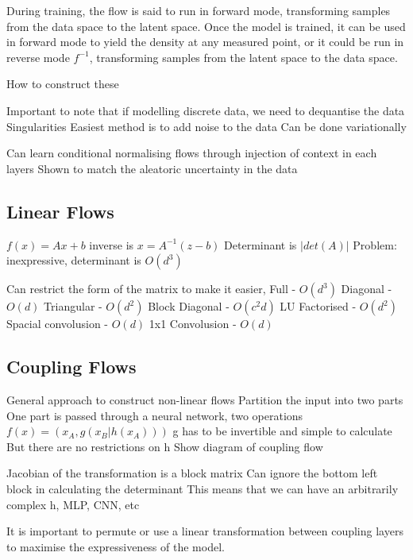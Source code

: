 During training, the flow is said to run in forward mode, transforming samples from the data space to the latent space.
Once the model is trained, it can be used in forward mode to yield the density at any measured point, or it could be run in reverse mode $f^{-1}$, transforming samples from the latent space to the data space.

How to construct these



Important to note that if modelling discrete data, we need to dequantise the data
Singularities
Easiest method is to add noise to the data
Can be done variationally

Can learn conditional normalising flows through injection of context in each layers
Shown to match the aleatoric uncertainty in the data

\subsection{Linear Flows}
$f(x) = Ax + b$
inverse is $x = A^{-1}(z - b)$
Determinant is $|det(A)|$
Problem: inexpressive, determinant is $O(d^3)$

Can restrict the form of the matrix to make it easier,
Full - $O(d^3)$
Diagonal - $O(d)$
Triangular - $O(d^2)$
Block Diagonal - $O(c^2d)$
LU Factorised - $O(d^2)$
Spacial convolusion - $O(d)$
1x1 Convolusion - $O(d)$

\subsection{Coupling Flows}

General approach to construct non-linear flows
Partition the input into two parts
One part is passed through a neural network, two operations
$f(x) = (x_A, g(x_B | h(x_A)))$
g has to be invertible and simple to calculate
But there are no restrictions on h
Show diagram of coupling flow

Jacobian of the transformation is a block matrix
Can ignore the bottom left block in calculating the determinant
This means that we can have an arbitrarily complex h, MLP, CNN, etc

It is important to permute or use a linear transformation between coupling layers to
maximise the expressiveness of the model.

